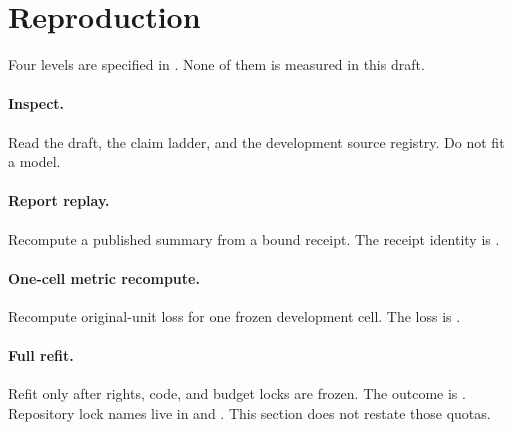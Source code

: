 \section{Reproduction}
Four levels are specified in .
None of them is measured in this draft.

\paragraph{Inspect.}
Read the draft, the claim ladder, and the development source registry.
Do not fit a model.

\paragraph{Report replay.}
Recompute a published summary from a bound receipt.
The receipt identity is .

\paragraph{One-cell metric recompute.}
Recompute original-unit loss for one frozen development cell.
The loss is .

\paragraph{Full refit.}
Refit only after rights, code, and budget locks are frozen.
The outcome is .
Repository lock names live in  and .
This section does not restate those quotas.

